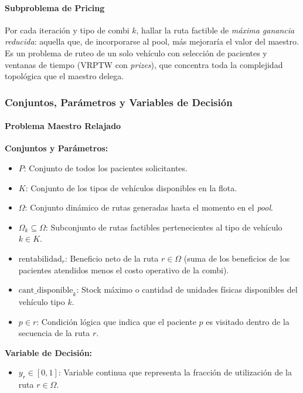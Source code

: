 \documentclass[12pt]{article}
\numberwithin{algorithm}{section}
\begin{document}
\paragraph{Subproblema de Pricing}

Por cada iteración y tipo de combi $k$, hallar la ruta factible de \emph{máxima ganancia reducida}: aquella que, de incorporarse al pool, más mejoraría el valor del maestro. Es un problema de ruteo de un solo vehículo con selección de pacientes y ventanas de tiempo (VRPTW con \emph{prizes}), que concentra toda la complejidad topológica que el maestro delega.

\subsubsection{Conjuntos, Parámetros y Variables de Decisión}

\paragraph{Problema Maestro Relajado}

\textbf{Conjuntos y Parámetros:}
\begin{itemize}
    \item $P$: Conjunto de todos los pacientes solicitantes.
    \item $K$: Conjunto de los tipos de vehículos disponibles en la flota.
    \item $\Omega$: Conjunto dinámico de rutas generadas hasta el momento en el \textit{pool}.
    \item $\Omega_k \subseteq \Omega$: Subconjunto de rutas factibles pertenecientes al tipo de vehículo $k \in K$.
    \item $\text{rentabilidad}_r$: Beneficio neto de la ruta $r \in \Omega$ (suma de los beneficios de los pacientes atendidos menos el costo operativo de la combi).
    \item $\text{cant\_disponible}_k$: Stock máximo o cantidad de unidades físicas disponibles del vehículo tipo $k$.
    \item $p \in r$: Condición lógica que indica que el paciente $p$ es visitado dentro de la secuencia de la ruta $r$.
\end{itemize}

\textbf{Variable de Decisión:}
\begin{itemize}
    \item $y_r \in [0, 1]$: Variable continua que representa la fracción de utilización de la ruta $r \in \Omega$.
\end{itemize}
\end{document}

